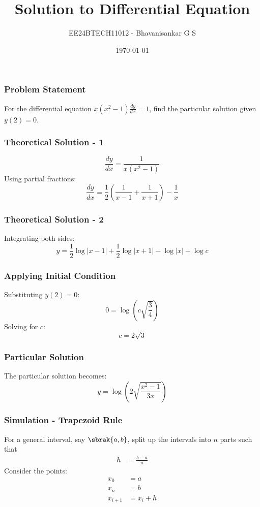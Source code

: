 \documentclass{beamer}
\title{Solution to Differential Equation}
\subtitle{EE24BTECH11012 - Bhavanisankar G S}
\date{\today}
\begin{document}
\frame{\titlepage}

\begin{frame}
\frametitle{Problem Statement}
For the differential equation \( x(x^2 - 1) \frac{dy}{dx} = 1 \), find the particular solution given \( y(2) = 0 \).
\end{frame}

\begin{frame}
\frametitle{Theoretical Solution - 1}
\[
\frac{dy}{dx} = \frac{1}{x(x^2 - 1)}
\]
Using partial fractions:
\[
\frac{dy}{dx} = \frac{1}{2} \left(\frac{1}{x-1} + \frac{1}{x+1}\right) - \frac{1}{x}
\]
\end{frame}

\begin{frame}
\frametitle{Theoretical Solution - 2}
Integrating both sides:
\[
y = \frac{1}{2} \log |x - 1| + \frac{1}{2} \log |x + 1| - \log |x| + \log c
\]
\end{frame}

\begin{frame}
\frametitle{Applying Initial Condition}
Substituting \( y(2) = 0 \):
\[
0 = \log \left( c \sqrt{\frac{3}{4}} \right)
\]
Solving for \( c \):
\[
c = 2\sqrt{3}
\]
\end{frame}

\begin{frame}
\frametitle{Particular Solution}
The particular solution becomes:
\[
y = \log \left( 2\sqrt{\frac{x^2 - 1}{3x}} \right)
\]
\end{frame}

\begin{frame}
\frametitle{Simulation - Trapezoid Rule}
For a general interval, say \(\sbrak{a,b}\), split up the intervals into \(n\) parts such that
\begin{align}
	h &= \frac{b-a}{n}
\end{align}
Consider the points:
\begin{align}
	x_{0} &= a \\
	x_{n} &= b \\
	x_{i+1} &= x_{i} + h
\end{align}
\end{frame}
\end{document}
